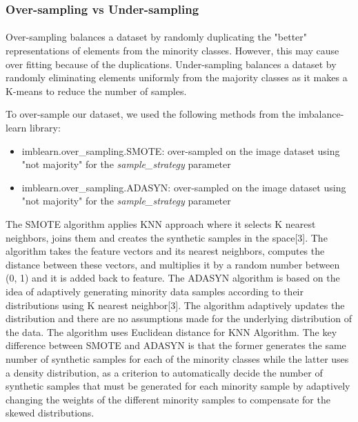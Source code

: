 \documentclass{article}
\begin{document}
\subsubsection{Over-sampling vs Under-sampling}
\paragraph{}
Over-sampling balances a dataset by randomly duplicating the "better" representations of elements from the minority classes. However, this may cause over fitting because of the duplications. Under-sampling balances a dataset by randomly eliminating elements uniformly from the majority classes as it makes a K-means to reduce the number of samples. 

To over-sample our dataset, we used the following methods from the imbalance-learn library:

\begin{itemize}
	\item imblearn.over\_sampling.SMOTE: over-sampled on the image dataset using "not majority" for the \textit{sample\_strategy} parameter
	
	\item imblearn.over\_sampling.ADASYN: over-sampled on the image dataset using "not majority" for the \textit{sample\_strategy} parameter
	
\end{itemize}

The SMOTE algorithm applies KNN approach where it selects K nearest neighbors, joins them and creates the synthetic samples in the space[3]. The algorithm takes the feature vectors and its nearest neighbors, computes the distance between these vectors, and multiplies it by a random number between (0, 1) and it is added back to feature. 
The ADASYN algorithm is based on the idea of adaptively generating minority data samples according to their distributions using K nearest neighbor[3]. The algorithm adaptively updates the distribution and there are no assumptions made for the underlying distribution of the data.  The algorithm uses Euclidean distance for KNN Algorithm. 
The key difference between SMOTE and ADASYN is that the former generates the same number of synthetic samples for each of the minority classes while the latter uses a density distribution, as a criterion to automatically decide the number of synthetic samples that must be generated for each minority sample by adaptively changing the weights of the different minority samples to compensate for the skewed distributions.
\end{document}
